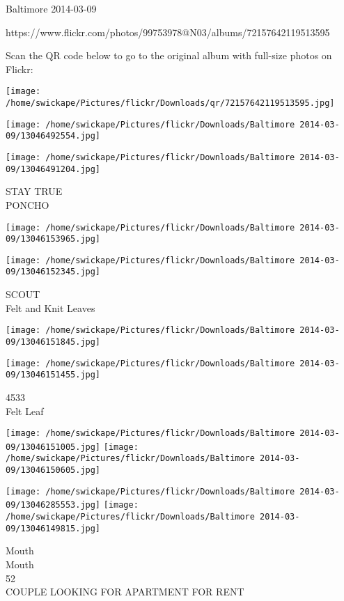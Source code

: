 \documentclass[10pt,letterpaper]{article}
\begin{document}
Baltimore 2014-03-09

https://www.flickr.com/photos/99753978@N03/albums/72157642119513595

Scan the QR code below to go to the original album with full-size photos on Flickr:

\texttt{[image: /home/swickape/Pictures/flickr/Downloads/qr/72157642119513595.jpg]}
\pagebreak

\texttt{[image: /home/swickape/Pictures/flickr/Downloads/Baltimore 2014-03-09/13046492554.jpg]}

\vspace{0.25in}
\texttt{[image: /home/swickape/Pictures/flickr/Downloads/Baltimore 2014-03-09/13046491204.jpg]}

STAY TRUE\\
PONCHO\\
\pagebreak

\texttt{[image: /home/swickape/Pictures/flickr/Downloads/Baltimore 2014-03-09/13046153965.jpg]}

\vspace{0.25in}
\texttt{[image: /home/swickape/Pictures/flickr/Downloads/Baltimore 2014-03-09/13046152345.jpg]}

SCOUT\\
Felt and Knit Leaves\\
\pagebreak

\texttt{[image: /home/swickape/Pictures/flickr/Downloads/Baltimore 2014-03-09/13046151845.jpg]}

\vspace{0.25in}
\texttt{[image: /home/swickape/Pictures/flickr/Downloads/Baltimore 2014-03-09/13046151455.jpg]}

4533\\
Felt Leaf\\
\pagebreak

\texttt{[image: /home/swickape/Pictures/flickr/Downloads/Baltimore 2014-03-09/13046151005.jpg]}
\texttt{[image: /home/swickape/Pictures/flickr/Downloads/Baltimore 2014-03-09/13046150605.jpg]}

\texttt{[image: /home/swickape/Pictures/flickr/Downloads/Baltimore 2014-03-09/13046285553.jpg]}
\texttt{[image: /home/swickape/Pictures/flickr/Downloads/Baltimore 2014-03-09/13046149815.jpg]}

Mouth\\
Mouth\\
52\\
COUPLE LOOKING FOR APARTMENT FOR RENT\\
\pagebreak
\end{document}
